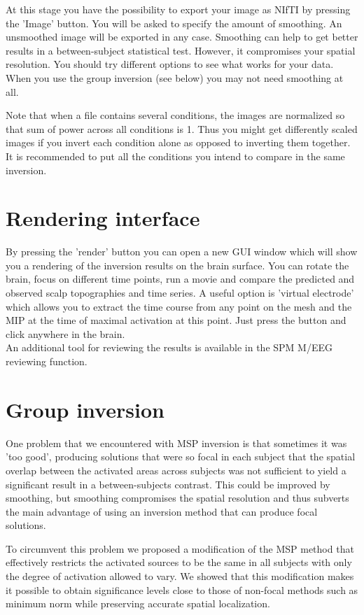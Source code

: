At this stage you have the possibility to export your image as NIfTI by pressing the 'Image' button. You will be asked to specify the amount of smoothing. An unsmoothed image will
be exported in any case. Smoothing can help to get better results in a between-subject statistical test. However, it compromises your spatial resolution. You should try different options
to see what works for your data. When you use the group inversion (see below) you may not need smoothing at all.

Note that when a file contains several conditions, the images are normalized so that sum of power across all conditions is 1. Thus you might get differently scaled images if you invert each
condition alone as opposed to inverting them together. It is recommended to put all the conditions you intend to compare in the same inversion.

\section{Rendering interface}
By pressing the 'render' button you can open a new GUI window which will show you a rendering of the inversion results on the brain surface. You can rotate the brain, focus on different
time points, run a movie and compare the predicted and observed scalp topographies and time series. A useful option is 'virtual electrode' which allows you to extract the time course from any
point on the mesh and the MIP at the time of maximal activation at this point. Just press the button and click anywhere in the brain.\\
An additional tool for reviewing the results is available in the SPM M/EEG reviewing function.

\section{Group inversion}
One problem that we encountered with MSP inversion is that sometimes it was 'too good', producing solutions that were so focal in each subject that the spatial overlap between the activated
areas across subjects was not sufficient to yield a significant result in a between-subjects contrast. This could be improved by smoothing, but smoothing compromises the spatial resolution
and thus subverts the main advantage of using an inversion method that can produce focal solutions. 

To circumvent this problem we proposed a modification of the MSP method \cite{vl_group}
that effectively restricts the activated sources to be the same in all subjects with only the degree of activation allowed to vary. We showed that this modification makes it possible to
obtain significance levels close to those of non-focal methods such as minimum norm while preserving accurate spatial localization. 

